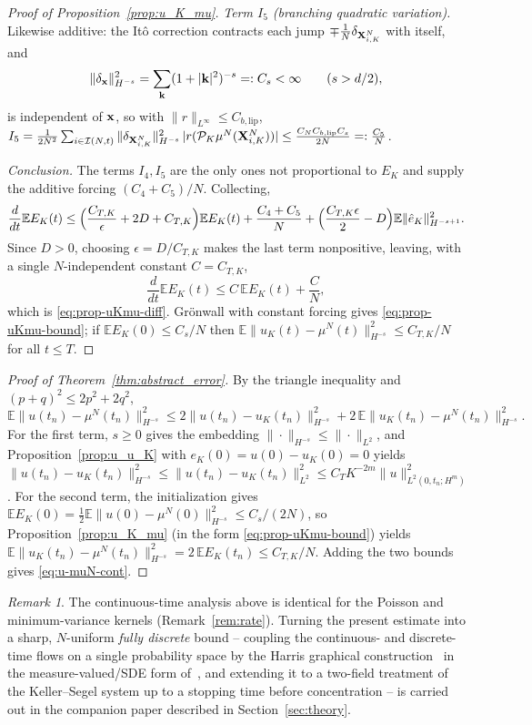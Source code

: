 \documentclass[a4paper,fleqn]{cas-sc}
\theoremstyle{definition}
\theoremstyle{remark}
\newtheorem{remark}[theorem]{Remark}
\begin{document}
\begin{proof}[Proof of Proposition~\ref{prop:u_K_mu}]
\emph{Term $I_5$ (branching quadratic variation).} Likewise additive: the It\^o
correction contracts each jump $\mp\tfrac1N\delta_{\mathbf{X}^N_{i,K}}$ with itself, and
\[
\|\delta_{\mathbf{x}}\|_{H^{-s}}^2=\sum_{\mathbf k}(1+|\mathbf k|^2)^{-s}=:C_s<\infty\qquad(s>d/2),
\]
is independent of $\mathbf{x}$, so with $\|r\|_{L^\infty}\le C_{b,\mathrm{lip}}$,
$I_5=\frac{1}{2N^2}\sum_{i\in\mathcal I(N,t)}\|\delta_{\mathbf{X}^N_{i,K}}\|_{H^{-s}}^2\,|r(\mathcal P_K\mu^N(\mathbf{X}^N_{i,K}))|
\le\frac{C_N C_{b,\mathrm{lip}}C_s}{2N}=:\frac{C_5}{N}$.

\emph{Conclusion.} The terms $I_4,I_5$ are the only ones not proportional to $E_K$
and supply the additive forcing $(C_4+C_5)/N$. Collecting,
\[
\frac{d}{dt}\mathbb EE_K(t)\le\Bigl(\frac{C_{T,K}}{\epsilon}+2D+C_{T,K}\Bigr)\mathbb EE_K(t)
+\frac{C_4+C_5}{N}+\Bigl(\frac{C_{T,K}\epsilon}{2}-D\Bigr)\mathbb E\|\hat e_K\|_{H^{-s+1}}^2 .
\]
Since $D>0$, choosing $\epsilon=D/C_{T,K}$ makes the last term nonpositive, leaving,
with a single $N$-independent constant $C=C_{T,K}$,
\[
\frac{d}{dt}\mathbb EE_K(t)\le C\,\mathbb EE_K(t)+\frac{C}{N},
\]
which is \eqref{eq:prop-uKmu-diff}. Gr\"onwall with constant forcing gives
\eqref{eq:prop-uKmu-bound}; if $\mathbb EE_K(0)\le C_s/N$ then
$\mathbb E\|u_K(t)-\mu^N(t)\|_{H^{-s}}^2\le C_{T,K}/N$ for all $t\le T$.
\end{proof}

\begin{proof}[Proof of Theorem~\ref{thm:abstract_error}]
By the triangle inequality and $(p+q)^2\le 2p^2+2q^2$,
\[
\mathbb E\|u(t_n)-\mu^N(t_n)\|_{H^{-s}}^2
\le 2\|u(t_n)-u_K(t_n)\|_{H^{-s}}^2+2\,\mathbb E\|u_K(t_n)-\mu^N(t_n)\|_{H^{-s}}^2 .
\]
For the first term, $s\ge0$ gives the embedding $\|\cdot\|_{H^{-s}}\le\|\cdot\|_{L^2}$,
and Proposition~\ref{prop:u_u_K} with $e_K(0)=u(0)-u_K(0)=0$ yields
$\|u(t_n)-u_K(t_n)\|_{H^{-s}}^2\le\|u(t_n)-u_K(t_n)\|_{L^2}^2\le C_T K^{-2m}\|u\|_{L^2(0,t_n;H^m)}^2$.
For the second term, the initialization gives
$\mathbb EE_K(0)=\tfrac12\mathbb E\|u(0)-\mu^N(0)\|_{H^{-s}}^2\le C_s/(2N)$, so
Proposition~\ref{prop:u_K_mu} (in the form \eqref{eq:prop-uKmu-bound}) yields
$\mathbb E\|u_K(t_n)-\mu^N(t_n)\|_{H^{-s}}^2=2\,\mathbb EE_K(t_n)\le C_{T,K}/N$. Adding
the two bounds gives \eqref{eq:u-muN-cont}.
\end{proof}

\begin{remark}
The continuous-time analysis above is identical for the Poisson and
minimum-variance kernels (Remark~\ref{rem:rate}). Turning the present estimate into
a sharp, $N$-uniform \emph{fully discrete} bound -- coupling the continuous- and
discrete-time flows on a single probability space by the Harris graphical
construction~\cite{harris1972nearest,bansaye2015stochastic} in the
measure-valued/SDE form of~\cite{fournier2004microscopic,hauray2009wasserstein,chaintron2021propagation},
and extending it to a two-field treatment of the Keller--Segel system up to a
stopping time before concentration -- is carried out in the companion paper
described in Section~\ref{sec:theory}.
\end{remark}
\end{document}
